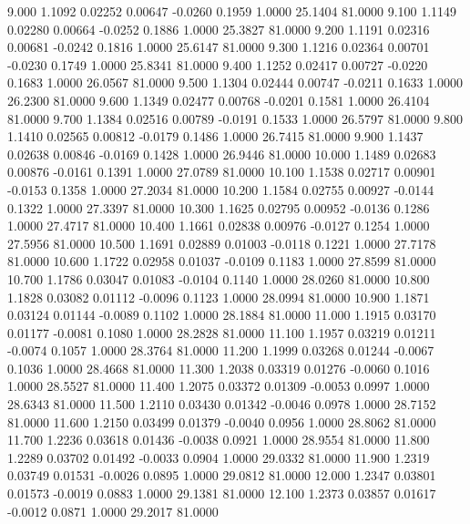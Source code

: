    9.000   1.1092   0.02252   0.00647  -0.0260   0.1959   1.0000  25.1404  81.0000
   9.100   1.1149   0.02280   0.00664  -0.0252   0.1886   1.0000  25.3827  81.0000
   9.200   1.1191   0.02316   0.00681  -0.0242   0.1816   1.0000  25.6147  81.0000
   9.300   1.1216   0.02364   0.00701  -0.0230   0.1749   1.0000  25.8341  81.0000
   9.400   1.1252   0.02417   0.00727  -0.0220   0.1683   1.0000  26.0567  81.0000
   9.500   1.1304   0.02444   0.00747  -0.0211   0.1633   1.0000  26.2300  81.0000
   9.600   1.1349   0.02477   0.00768  -0.0201   0.1581   1.0000  26.4104  81.0000
   9.700   1.1384   0.02516   0.00789  -0.0191   0.1533   1.0000  26.5797  81.0000
   9.800   1.1410   0.02565   0.00812  -0.0179   0.1486   1.0000  26.7415  81.0000
   9.900   1.1437   0.02638   0.00846  -0.0169   0.1428   1.0000  26.9446  81.0000
  10.000   1.1489   0.02683   0.00876  -0.0161   0.1391   1.0000  27.0789  81.0000
  10.100   1.1538   0.02717   0.00901  -0.0153   0.1358   1.0000  27.2034  81.0000
  10.200   1.1584   0.02755   0.00927  -0.0144   0.1322   1.0000  27.3397  81.0000
  10.300   1.1625   0.02795   0.00952  -0.0136   0.1286   1.0000  27.4717  81.0000
  10.400   1.1661   0.02838   0.00976  -0.0127   0.1254   1.0000  27.5956  81.0000
  10.500   1.1691   0.02889   0.01003  -0.0118   0.1221   1.0000  27.7178  81.0000
  10.600   1.1722   0.02958   0.01037  -0.0109   0.1183   1.0000  27.8599  81.0000
  10.700   1.1786   0.03047   0.01083  -0.0104   0.1140   1.0000  28.0260  81.0000
  10.800   1.1828   0.03082   0.01112  -0.0096   0.1123   1.0000  28.0994  81.0000
  10.900   1.1871   0.03124   0.01144  -0.0089   0.1102   1.0000  28.1884  81.0000
  11.000   1.1915   0.03170   0.01177  -0.0081   0.1080   1.0000  28.2828  81.0000
  11.100   1.1957   0.03219   0.01211  -0.0074   0.1057   1.0000  28.3764  81.0000
  11.200   1.1999   0.03268   0.01244  -0.0067   0.1036   1.0000  28.4668  81.0000
  11.300   1.2038   0.03319   0.01276  -0.0060   0.1016   1.0000  28.5527  81.0000
  11.400   1.2075   0.03372   0.01309  -0.0053   0.0997   1.0000  28.6343  81.0000
  11.500   1.2110   0.03430   0.01342  -0.0046   0.0978   1.0000  28.7152  81.0000
  11.600   1.2150   0.03499   0.01379  -0.0040   0.0956   1.0000  28.8062  81.0000
  11.700   1.2236   0.03618   0.01436  -0.0038   0.0921   1.0000  28.9554  81.0000
  11.800   1.2289   0.03702   0.01492  -0.0033   0.0904   1.0000  29.0332  81.0000
  11.900   1.2319   0.03749   0.01531  -0.0026   0.0895   1.0000  29.0812  81.0000
  12.000   1.2347   0.03801   0.01573  -0.0019   0.0883   1.0000  29.1381  81.0000
  12.100   1.2373   0.03857   0.01617  -0.0012   0.0871   1.0000  29.2017  81.0000
